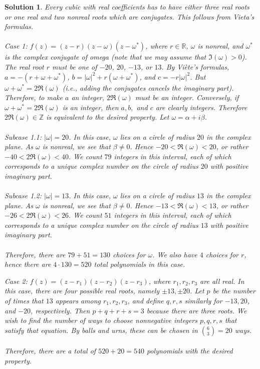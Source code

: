 \documentclass[12pt]{article}
\newtheorem*{solution*}{Solution}
\begin{document}
\begin{solution*}
Every cubic with real coefficients has to have either three real roots or one real and two nonreal roots which are conjugates. This follows from Vieta's formulas.
\\ \\
Case 1: $f(z)=(z-r)(z-\omega)(z-\omega^*)$, where $r\in \mathbb{R}$, $\omega$ is nonreal, and $\omega^*$ is the complex conjugate of omega (note that we may assume that $\Im(\omega)>0$).
The real root $r$ must be one of $-20$, $20$, $-13$, or $13$. By Viète's formulas, $a=-(r+\omega+\omega^*)$, $b=|\omega|^2+r(\omega+\omega^*)$, and $c=-r|\omega|^2$. But $\omega+\omega^*=2\Re{(\omega)}$ (i.e., adding the conjugates cancels the imaginary part). Therefore, to make $a$ an integer, $2\Re{(\omega)}$ must be an integer. Conversely, if $\omega+\omega^*=2\Re{(\omega)}$ is an integer, then $a,b,$ and $c$ are clearly integers. Therefore $2\Re{(\omega)}\in \mathbb{Z}$ is equivalent to the desired property. Let $\omega=\alpha+i\beta$.
\\ \\
Subcase 1.1: $|\omega|=20$.
In this case, $\omega$ lies on a circle of radius $20$ in the complex plane. As $\omega$ is nonreal, we see that $\beta\ne 0$. Hence $-20<\Re{(\omega)}< 20$, or rather $-40<2\Re{(\omega)}< 40$. We count $79$ integers in this interval, each of which corresponds to a unique complex number on the circle of radius $20$ with positive imaginary part.
\\ \\
Subcase 1.2: $|\omega|=13$.
In this case, $\omega$ lies on a circle of radius $13$ in the complex plane. As $\omega$ is nonreal, we see that $\beta\ne 0$. Hence $-13<\Re{(\omega)}< 13$, or rather $-26<2\Re{(\omega)}< 26$. We count $51$ integers in this interval, each of which corresponds to a unique complex number on the circle of radius $13$ with positive imaginary part.
\\ \\
Therefore, there are $79+51=130$ choices for $\omega$. We also have $4$ choices for $r$, hence there are $4\cdot 130=520$ total polynomials in this case.

Case 2: $f(z)=(z-r_1)(z-r_2)(z-r_3)$, where $r_1,r_2,r_3$ are all real.
In this case, there are four possible real roots, namely $\pm 13, \pm20$. Let $p$ be the number of times that $13$ appears among $r_1,r_2,r_3$, and define $q,r,s$ similarly for $-13,20$, and $-20$, respectively. Then $p+q+r+s=3$ because there are three roots. We wish to find the number of ways to choose nonnegative integers $p,q,r,s$ that satisfy that equation. By balls and urns, these can be chosen in $\binom{6}{3}=20$ ways.
\\ \\
Therefore, there are a total of $520+20=\boxed{540}$ polynomials with the desired property.
\end{solution*}
\end{document}

